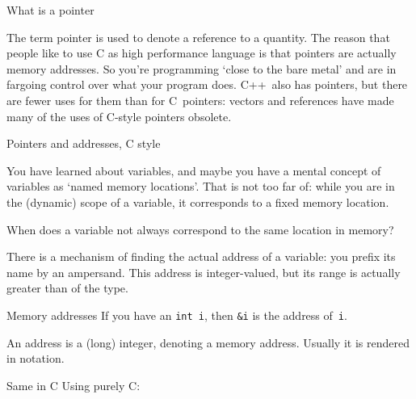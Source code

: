 
 {What is a pointer}

The term pointer is used to denote a reference to a quantity. The
reason that people like to use C as high performance language is that
pointers are actually memory addresses. So you're programming `close
to the bare metal' and are in fargoing control over what your program
does. C++~also has pointers, but there are fewer uses for them than
for C~pointers: vectors and references have made many of the uses
of C-style pointers obsolete.

 {Pointers and addresses, C style}
\label{sec:cderef}

You have learned about variables, and maybe you have a mental concept
of variables as `named memory locations'. That is not too far of:
while you are in the (dynamic) scope of a variable, it corresponds to
a fixed memory location.

\begin{exercise}
  \label{ex:varmemscope}
  When does a variable not always correspond to the same location in
  memory?
\end{exercise}

There is a mechanism of finding the actual address of a variable: you
prefix its name by an ampersand. 
This address is integer-valued, but
its range is actually greater than of the  type.

\begin{block}{Memory addresses}
  \label{sl:ampersand}
  If you have an \lstinline{int i}, then \lstinline{&i} is the address of~\lstinline{i}.

An address is a (long) integer, denoting a memory address. Usually it
is rendered in  notation.
%
\end{block}

\begin{block}{Same in C}
    \label{sl:ampersandc}
  Using purely C:
%
%
\end{block}

